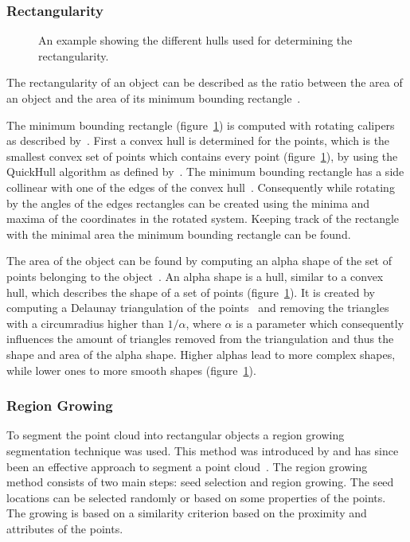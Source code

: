 {\subsubsection{Rectangularity}
\begin{figure}
	\centering
	
	\caption{An example showing the different hulls used for determining the rectangularity.}
	\label{fig:hulls}
\end{figure}
The rectangularity of an object can be described as the ratio between the area of an object and the area of its minimum bounding rectangle~\citep{rosin1999measuring}.

The minimum bounding rectangle (figure~\ref{fig:hulls}) is computed with rotating calipers as described by~\citet{toussaint1983solving}. First a convex hull is determined for the points, which is the smallest convex set of points which contains every point (figure~\ref{fig:hulls}), by using the QuickHull algorithm as defined by~\citet{preparata1985computational}. The minimum bounding rectangle has a side collinear with one of the edges of the convex hull~\citep{freeman1975determining}. Consequently while rotating by the angles of the edges rectangles can be created using the minima and maxima of the coordinates in the rotated system. Keeping track of the rectangle with the minimal area the minimum bounding rectangle can be found.

The area of the object can be found by computing an alpha shape of the set of points belonging to the object~\citep{edelsbrunner1983shape}. An alpha shape is a hull, similar to a convex hull, which describes the shape of a set of points (figure~\ref{fig:hulls}). It is created by computing a Delaunay triangulation of the points~\citep{delaunay1934sphere} and removing the triangles with a circumradius higher than \(1/\alpha\), where \(\alpha\) is a parameter which consequently influences the amount of triangles removed from the triangulation and thus the shape and area of the alpha shape. Higher alphas lead to more complex shapes, while lower ones to more smooth shapes (figure~\ref{fig:hulls}).

\subsubsection{Region Growing}
To segment the point cloud into rectangular objects a region growing segmentation technique was used. This method was introduced by \citet{besl1988segmentation} and has since been an effective approach to segment a point cloud~\citep{tovari2005segmentation, rabbani2006segmentation, nurunnabi2012robust, vosselman2013point, elberink2014user, vo2015octree}. The region growing method consists of two main steps: seed selection and region growing. The seed locations can be selected randomly or based on some properties of the points. The growing is based on a similarity criterion based on the proximity and attributes of the points.

}

